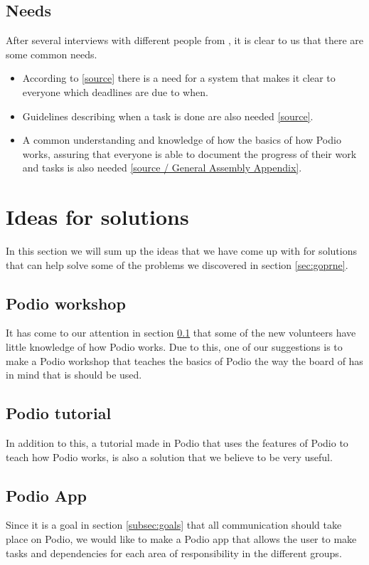 \subsection{Needs}
\label{subsec:needs}
After several interviews with different people from \mil, it is clear to us that
there are some common needs.
\begin{itemize}
    \item According to \ref{source} there is a need for a system that makes it
    clear to everyone which deadlines are due to when.
    \item Guidelines describing when a task is done are also needed
    \ref{source}.
    \item A common understanding and knowledge of how the basics of how Podio
    works, assuring that everyone is able to document the progress of their work
    and tasks is also needed \ref{source / General Assembly Appendix}.
\end{itemize}

\section{Ideas for solutions}
In this section we will sum up the ideas that we have come up with for solutions
that can help solve some of the problems we discovered in section \ref{sec:goprne}.

\subsection{Podio workshop}
It has come to our attention in section \ref{subsec:needs} that
some of the new volunteers have little knowledge of how Podio works. Due to
this, one of our suggestions is to make a Podio workshop that teaches the basics
of Podio the way the board of \mil has in mind that is should be used.

\subsection{Podio tutorial}
In addition to this, a tutorial made in Podio that uses the features of Podio to
teach how Podio works, is also a solution that we believe to be very useful.

\subsection{Podio App}
Since it is a goal in section \ref{subsec:goals} that all communication should take place
on Podio, we would like to make a Podio app that allows the user to make tasks
and dependencies for each area of responsibility in the different groups.

